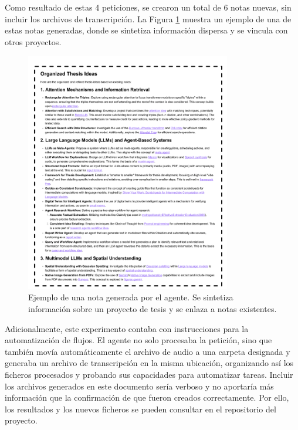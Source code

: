 Como resultado de estas 4 peticiones, se crearon un total de 6 notas nuevas, sin incluir los archivos de transcripción. La Figura \ref{fig:para_synthesis} muestra un ejemplo de una de estas notas generadas, donde se sintetiza información dispersa y se vincula con otros proyectos.

\begin{figure}[h!]
    \centering
    \includegraphics[width=0.8\textwidth]{figures/ideaSynthBx.pdf} 
    \caption{Ejemplo de una nota generada por el agente. Se sintetiza información sobre un proyecto de tesis y se enlaza a notas existentes.}
    \label{fig:para_synthesis}
\end{figure}

Adicionalmente, este experimento contaba con instrucciones para la automatización de flujos. El agente no solo procesaba la petición, sino que también movía automáticamente el archivo de audio a una carpeta designada y generaba un archivo de transcripción en la misma ubicación, organizando así los ficheros procesados y probando sus capacidades para automatizar tareas. Incluir los archivos generados en este documento sería verboso y no aportaría más información que la confirmación de que fueron creados correctamente. Por ello, los resultados y los nuevos ficheros se pueden consultar en el repositorio del proyecto.

